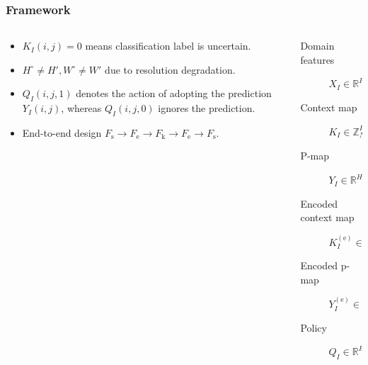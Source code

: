 \documentclass[12pt, aspectratio = 169, xcolor = x11names]{beamer}
\begin{document}
\begin{frame}
  \frametitle{Framework}
  \begin{columns}
    \begin{column}{0.45\textwidth}
      \begin{itemize}[<+->]
        \item$K_I(i, j) = 0$ means classification label is uncertain.
        \item$H^\circ \neq H', W^\circ \neq W'$ due to resolution
          degradation.
        \item$Q_I(i, j, 1)$ denotes the action of adopting the prediction
          $Y_I(i, j)$, whereas $Q_I(i, j, 0)$ ignores the prediction.
        \item<+-|alert@+>End-to-end design $F_\mathrm{s} \rightarrow
          F_\mathrm{e} \rightarrow F_\mathrm{k} \rightarrow
          F_\mathrm{e} \rightarrow F_\mathrm{s}$.
      \end{itemize}
    \end{column}
    \begin{column}{0.55\textwidth}
      \begin{description}
        \item[Domain features]$X_I \in \mathbb{R}^{H' \times W' \times C}$
        \item[Context map]$K_I \in \mathbb{Z}_{N_\mathrm{c} + 1}^{H' \times W'}$
        \item[P-map]$Y_I \in \mathbb{R}^{H^\circ \times W^\circ}$
        \item[Encoded context map]$K_I^{(\mathrm{e})} \in \mathbb{R}^{H'
          \times W' \times C_\mathrm{e}}$
        \item[Encoded p-map]$Y_I^{(\mathrm{e})} \in \mathbb{R}^{H^\circ
          \times W^\circ \times C_\mathrm{e}}$
        \item[Policy]$Q_I \in \mathbb{R}^{H^\circ \times W^\circ \times 2}$
      \end{description}
    \end{column}
  \end{columns}
\end{frame}
\end{document}
